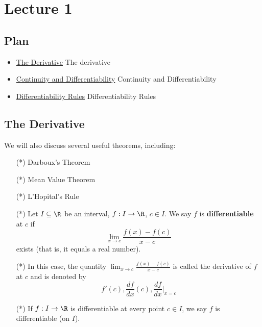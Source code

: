 \section{Lecture 1}

\subsection{Plan}

\begin{itemize}
    \item {\hyperref[The Derivative]{The Derivative}} The derivative
    \item {\hyperref[Continuity and Differentiability]{Continuity and Differentiability}} Continuity and Differentiability
    \item {\hyperref[Differentiability Rules]{Differentiability Rules}} Differentiability Rules
\end{itemize}

\subsection{The Derivative}\label{The Derivative}

We will also discuss several useful theorems, including: 

\begin{enumerate}
    \item[(*)] Darboux's Theorem
    \item[(*)] Mean Value Theorem
    \item[(*)] L'Hopital's Rule
\end{enumerate}

\begin{definition}[Differentiability]
    \begin{enumerate}
        \item[(*)] Let \( I \subseteq  \R  \) be an interval, \( f: I \to \R  \), \( c \in I  \). We say \( f  \) is \textbf{differentiable} at \( c  \) if 
    \[  \lim_{ x \to c }  \frac{ f(x) -f(c) }{ x - c  } \]
    exists (that is, it equals a real number).
    \item[(*)] In this case, the quantity \( \lim_{ x \to c }  \frac{ f(x) - f(c) }{ x - c  }  \) is called the derivative of \( f  \) at \( c  \) and is denoted by
        \[  f'(c), \frac{ df }{ dx }(c), \frac{ df }{ dx } \Bigg|_{x = c} \]
    \item[(*)] If \( f: I \to \R  \) is differentiable at every point \( c \in I  \), we say \( f \) is differentiable (on \( I  \)).
    \end{enumerate}
\end{definition}



